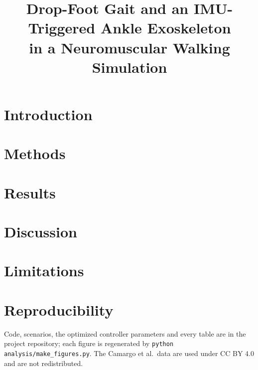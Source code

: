 \documentclass[conference]{IEEEtran}
\begin{document}
\title{Drop-Foot Gait and an IMU-Triggered Ankle Exoskeleton\\in a Neuromuscular Walking Simulation}

\author{
}

\maketitle

\begin{abstract}

\end{abstract}

\section{Introduction}


\section{Methods}


\section{Results}


\section{Discussion}


\section{Limitations}


\section*{Reproducibility}
Code, scenarios, the optimized controller parameters and every table are in the project repository; each figure is regenerated by \texttt{python analysis/make\_figures.py}. The Camargo et al.\ data are used under CC BY 4.0 and are not redistributed.



\end{document}
